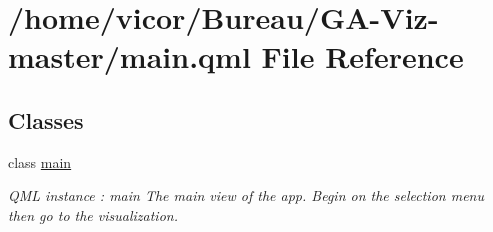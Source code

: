 \hypertarget{main_8qml}{}\section{/home/vicor/\+Bureau/\+G\+A-\/\+Viz-\/master/main.qml File Reference}
\label{main_8qml}
\subsection*{Classes}
\begin{DoxyCompactItemize}
\item 
class \hyperlink{classmain}{main}
\begin{DoxyCompactList}\small\item\em Q\+ML instance \+: main The main view of the app. Begin on the selection menu then go to the visualization. \end{DoxyCompactList}\end{DoxyCompactItemize}
